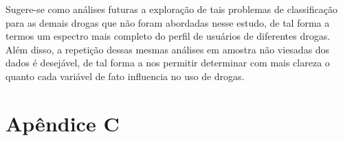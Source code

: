 \documentclass[
	article,			%
	11pt,				%
	oneside,			%
	a4paper,			%
	english,			%
	brazil,				%
	sumario=tradicional
	]{abntex2}
\begin{document}
Sugere-se como análises futuras a exploração de tais problemas de classificação para as demais drogas que não foram abordadas nesse estudo, de tal forma a termos um espectro mais completo do perfil de usuários de diferentes drogas. Além disso, a repetição dessas mesmas análises em amostra não viesadas dos dados é desejável, de tal forma a nos permitir determinar com mais clareza o quanto cada variável de fato influencia no uso de drogas.






%
%


\break






\restoregeometry

\break




\restoregeometry


%
%


\section*{\textbf{Apêndice C}}
\end{document}
